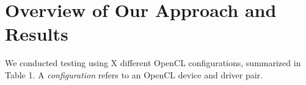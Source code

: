 \section{Overview of Our Approach and Results}\label{sec:overview}

We conducted testing using X different OpenCL configurations, summarized in Table 1. A \emph{configuration} refers to an OpenCL device and driver pair.